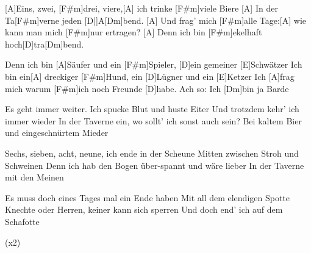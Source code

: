 


\begin{guitar}
	[A]Eins, zwei, [F#m]drei, viere,[A] ich trinke [F#m]viele Biere
	[A] In der Ta[F#m]verne jeden [D|]A[Dm]bend.
	[A] Und frag' mich [F#m]alle Tage:[A] wie kann man mich [F#m]nur ertragen?
	[A] Denn ich bin [F#m]ekelhaft hoch[D]tra[Dm]bend.
	
	Denn ich bin [A]Säufer und ein [F#m]Spieler, [D]ein gemeiner [E]Schwätzer
	Ich bin ein[A] dreckiger [F#m]Hund, ein [D]Lügner und ein [E]Ketzer
	Ich [A]frag mich warum [F#m]ich noch Freunde [D]habe. Ach so: Ich [Dm]bin ja Barde
	
	Es geht immer weiter. Ich spucke Blut und huste Eiter
	Und trotzdem kehr' ich immer wieder
	In der Taverne ein, wo sollt' ich sonst auch sein?
	Bei kaltem Bier und eingeschnürtem Mieder
	
	 
	
	Sechs, sieben, acht, neune, ich ende in der Scheune
	Mitten zwischen Stroh und Schweinen
	Denn ich hab den Bogen über-spannt und wäre lieber
	In der Taverne mit den Meinen
	
	 
	
	Es muss doch eines Tages mal ein Ende haben
	Mit all dem elendigen Spotte
	Knechte oder Herren, keiner kann sich sperren
	Und doch end' ich auf dem Schafotte
	
	  (x2)

\end{guitar}